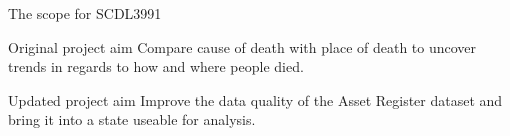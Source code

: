\documentclass[]{beamer}
\begin{document}
\begin{frame}{The scope for SCDL3991}

	\begin{alertblock}{Original project aim}
		Compare cause of death with place of death to uncover trends in regards to how and where people died.
	\end{alertblock}

	\begin{exampleblock}{Updated project aim}
		Improve the data quality of the Asset Register dataset and bring it into a state useable for analysis.
	\end{exampleblock}

	\vspace{1em}

\end{frame}









\end{document}
